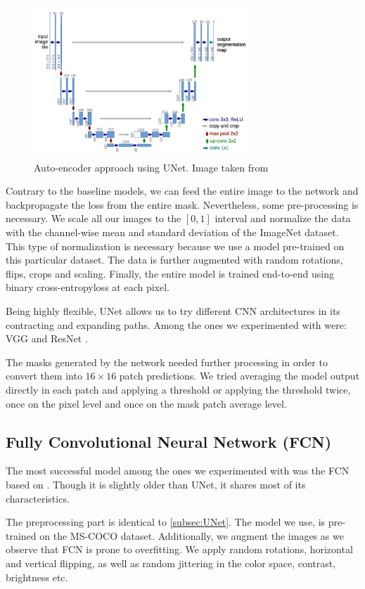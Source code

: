 \begin{figure}[h]
\includegraphics[width=8cm]{images/unet.png}
\caption{Auto-encoder approach using UNet. Image taken from \cite{unet}}
\end{figure}

Contrary to the baseline models, we can feed the entire image to the network and backpropagate the loss from the entire mask. Nevertheless, some pre-processing is necessary. We scale all our images to the $[0,1]$ interval and normalize the data with the channel-wise mean and standard deviation of the ImageNet \cite{Imagenet} dataset. This type of normalization is necessary because we use a model pre-trained on this particular dataset. The data is further augmented with random rotations, flips, crops and scaling. Finally, the entire model is trained end-to-end using binary cross-entropyloss at each pixel.

Being highly flexible, UNet allows us to try different CNN architectures in its contracting and expanding paths. Among the ones we experimented with were: VGG \cite{Zis14} and ResNet \cite{He15}.

The masks generated by the network needed further processing in order to convert them into $16 \times 16$ patch predictions. We tried averaging the model output directly in each patch and applying a threshold or applying the threshold twice, once on the pixel level and once on the mask patch average level.

\subsection{Fully Convolutional Neural Network (FCN)} \label{subsec:fcn}
The most successful model among the ones we experimented with was the FCN based on \cite{Lon14}. Though it is slightly older than UNet, it shares most of its characteristics.

The preprocessing part is identical to \autoref{subsec:UNet}. The model we use, is pre-trained on the MS-COCO dataset. Additionally, we augment the images as we observe that FCN is prone to overfitting. We apply random rotations, horizontal and vertical flipping, as well as random jittering in the color space, contrast, brightness etc.

